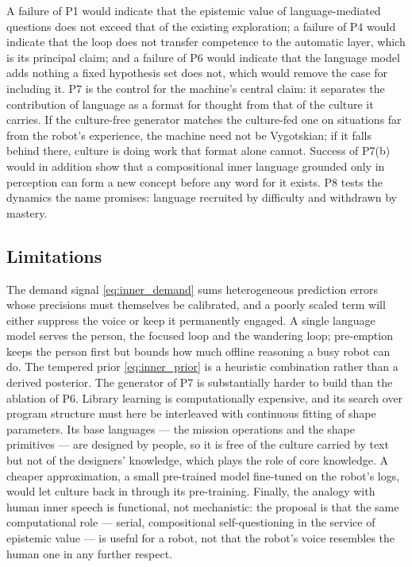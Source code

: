 A failure of P1 would indicate that the epistemic value of language-mediated questions does not exceed that of
the existing exploration; a failure of P4 would indicate that the loop does not transfer competence to the
automatic layer, which is its principal claim; and a failure of P6 would indicate that the language model adds
nothing a fixed hypothesis set does not, which would remove the case for including it. P7 is the control for the
machine's central claim: it separates the contribution of language as a format for thought from that of the
culture it carries. If the culture-free generator matches the culture-fed one on situations far from the robot's
experience, the machine need not be Vygotskian; if it falls behind there, culture is doing work that format alone
cannot. Success of P7(b) would in addition show that a compositional inner language grounded only in perception can
form a new concept before any word for it exists. P8 tests the dynamics the name promises: language recruited by
difficulty and withdrawn by mastery.

\subsection{Limitations}
\label{sec:inner_speech:limitations}

The demand signal \eqref{eq:inner_demand} sums heterogeneous prediction errors whose precisions must themselves be
calibrated, and a poorly scaled term will either suppress the voice or keep it permanently engaged. A single
language model serves the person, the focused loop and the wandering loop; pre-emption keeps the person first but
bounds how much offline reasoning a busy robot can do. The tempered prior \eqref{eq:inner_prior} is a heuristic
combination rather than a derived posterior. The generator of P7 is substantially harder to build than the
ablation of P6. Library learning is computationally expensive, and its search over program structure must here be
interleaved with continuous fitting of shape parameters. Its base languages --- the mission operations and the shape
primitives --- are designed by people, so it is free of the culture carried by text but not of the designers'
knowledge, which plays the role of core knowledge. A cheaper approximation, a small pre-trained model fine-tuned on
the robot's logs, would let culture back in through its pre-training. Finally, the analogy with human inner speech
is functional, not
mechanistic: the proposal is that the same computational role --- serial, compositional self-questioning in the
service of epistemic value --- is useful for a robot, not that the robot's voice resembles the human one in any
further respect.
